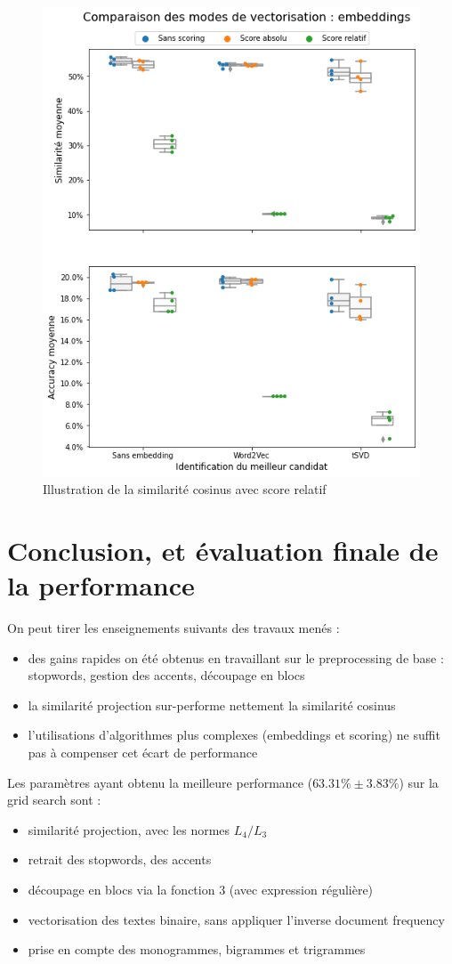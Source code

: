             \begin{figure}[htbp]
                \begin{center}
                \includegraphics[width=0.6\linewidth]{img/tuning_embedding.png}
                \end{center}
                \caption{Illustration de la similarité cosinus avec score relatif}
                \label{fig:tuning_embedding}
            \end{figure}

            \section{Conclusion, et évaluation finale de la performance}

            On peut tirer les enseignements suivants des travaux menés :
            \begin{itemize}
                \item des gains rapides on été obtenus en travaillant sur le preprocessing de base : stopwords, gestion des accents, découpage en blocs
                \item la similarité projection sur-performe nettement la similarité cosinus
                \item l'utilisations d'algorithmes plus complexes (embeddings et scoring) ne suffit pas à compenser cet écart de performance
            \end{itemize}

            Les paramètres ayant obtenu la meilleure performance ($63.31\% \pm 3.83\%$) sur la grid search sont : 
            \begin{itemize}
                \item similarité projection, avec les normes $L_{4}/L_{3}$
                \item retrait des stopwords, des accents
                \item découpage en blocs via la fonction 3 (avec expression régulière)
                \item vectorisation des textes binaire, sans appliquer l'inverse document frequency
                \item prise en compte des monogrammes, bigrammes et trigrammes
            \end{itemize}

